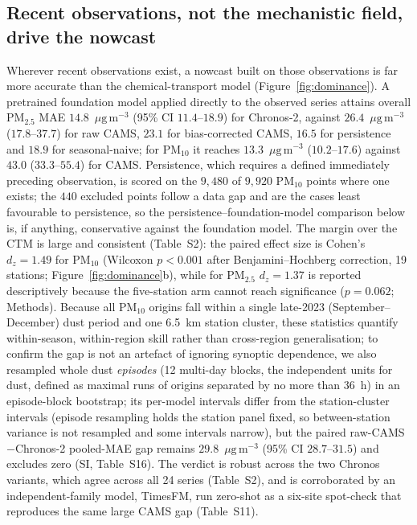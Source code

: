 \documentclass[review,times,authoryear]{elsarticle}
\newcommand*{\ugm}{\ensuremath{\mu\mathrm{g\,m^{-3}}}}
\newcommand*{\pmtf}{\ensuremath{\mathrm{PM_{2.5}}}}
\newcommand*{\pmten}{\ensuremath{\mathrm{PM_{10}}}}
\begin{document}
\subsection{Recent observations, not the mechanistic field, drive the nowcast}
Wherever recent observations exist, a nowcast built on those observations is far more accurate than the chemical-transport model (Figure~\ref{fig:dominance}). A pretrained foundation model applied directly to the observed series attains overall \pmtf{} MAE $14.8$~\ugm{} (95\% CI $11.4$--$18.9$) for Chronos-2, against $26.4$~\ugm{} ($17.8$--$37.7$) for raw CAMS, $23.1$ for bias-corrected CAMS, $16.5$ for persistence and $18.9$ for seasonal-naive; for \pmten{} it reaches $13.3$~\ugm{} ($10.2$--$17.6$) against $43.0$ ($33.3$--$55.4$) for CAMS. Persistence, which requires a defined immediately preceding observation, is scored on the $9{,}480$ of $9{,}920$ \pmten{} points where one exists; the $440$ excluded points follow a data gap and are the cases least favourable to persistence, so the persistence--foundation-model comparison below is, if anything, conservative against the foundation model. The margin over the CTM is large and consistent (Table~S2): the paired effect size is Cohen's $d_z=1.49$ for \pmten{} (Wilcoxon $p<0.001$ after Benjamini--Hochberg correction, 19 stations; Figure~\ref{fig:dominance}b), while for \pmtf{} $d_z=1.37$ is reported descriptively because the five-station arm cannot reach significance ($p=0.062$; Methods). Because all \pmten{} origins fall within a single late-2023 (September--December) dust period and one 6.5~km station cluster, these statistics quantify within-season, within-region skill rather than cross-region generalisation; to confirm the gap is not an artefact of ignoring synoptic dependence, we also resampled whole dust \emph{episodes} (12 multi-day blocks, the independent units for dust, defined as maximal runs of origins separated by no more than 36~h) in an episode-block bootstrap; its per-model intervals differ from the station-cluster intervals (episode resampling holds the station panel fixed, so between-station variance is not resampled and some intervals narrow), but the paired raw-CAMS$-$Chronos-2 pooled-MAE gap remains $29.8$~\ugm{} (95\% CI $28.7$--$31.5$) and excludes zero (SI, Table~S16). The verdict is robust across the two Chronos variants, which agree across all 24 series (Table~S2), and is corroborated by an independent-family model, TimesFM, run zero-shot as a six-site spot-check that reproduces the same large CAMS gap (Table~S11).
\end{document}

